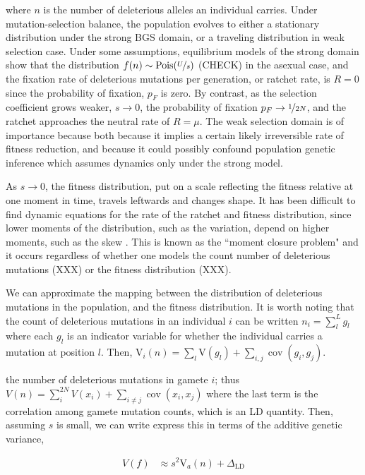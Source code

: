 \documentclass[11pt]{article}
\newcommand{\V}{\text{V}}
\DeclareMathOperator{\cov}{cov}
\begin{document}
where $n$ is the number of deleterious alleles an individual carries. Under
mutation-selection balance, the population evolves to either a stationary
distribution under the strong BGS domain, or a traveling distribution in weak
selection case. Under some assumptions, equilibrium models of the strong domain
show that the distribution $f(n) \sim \text{Pois}(\nicefrac{U}{s})$
\parencite{Kimura1966-bk,Crow1970-wj} (CHECK) in the asexual case, and the
fixation rate of deleterious mutations per generation, or ratchet rate, is $R =
0$ since the probability of fixation, $p_F$ is zero. By contrast, as the
selection coefficient grows weaker, $s \to 0$, the probability of fixation $p_F
\to \nicefrac{1}{2N}$, and the ratchet approaches the neutral rate of $R =
\mu$. The weak selection domain is of importance because both because it
implies a certain likely irreversible rate of fitness reduction, and because it
could possibly confound population genetic inference which assumes dynamics
only under the strong model.

As $s \to 0$, the fitness distribution, put on a scale reflecting the fitness
relative at one moment in time, travels leftwards and changes shape. It has
been difficult to find dynamic equations for the rate of the ratchet and
fitness distribution, since lower moments of the distribution, such as the
variation, depend on higher moments, such as the skew
\parencite{Good2013-lp,Haigh1978-gt,Higgs1995-xc}. This is known as the ``moment
closure problem" and it occurs regardless of whether one models the count
number of deleterious mutations (XXX) or the fitness distribution (XXX).

We can approximate the mapping between the distribution of deleterious
mutations in the population, and the fitness distribution. It is worth noting
that the count of deleterious mutations in an individual $i$ can be written
$n_i = \sum_l^{L} g_l$ where each $g_l$ is an indicator variable for whether
the individual carries a mutation at position $l$. Then, $\V_i(n) = \sum_l
\V(g_l) + \sum_{i,j}\cov(g_i, g_j)$.

the
number of deleterious mutations in gamete $i$; thus $V(n) = \sum_i^{2N} V(x_i)
+ \sum_{i \ne j} \cov(x_i, x_j)$ where the last term is the correlation among
gamete mutation counts, which is an LD quantity. Then, assuming $s$ is small,
we can write express this in terms of the additive genetic variance, 

\begin{align}
  V(f) &\approx s^2 \V_a(n) + \Delta_\text{LD}
\end{align}
\end{document}
